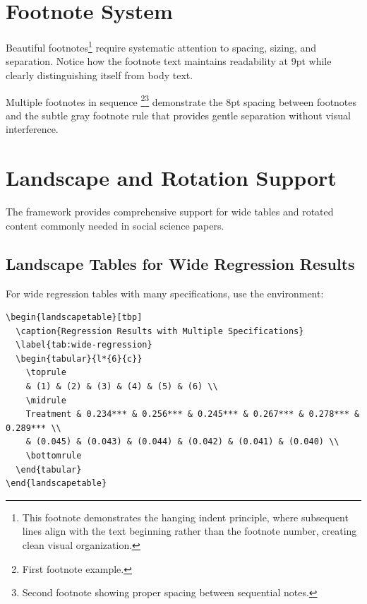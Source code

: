 \documentclass[11pt]{article}
\begin{document}
\section{Footnote System}

Beautiful footnotes\footnote{This footnote demonstrates the hanging indent principle, where subsequent lines align with the text beginning rather than the footnote number, creating clean visual organization.} require systematic attention to spacing, sizing, and separation. Notice how the footnote text maintains readability at 9pt while clearly distinguishing itself from body text.

Multiple footnotes in sequence \footnote{First footnote example.}\footnote{Second footnote showing proper spacing between sequential notes.} demonstrate the 8pt spacing between footnotes and the subtle gray footnote rule that provides gentle separation without visual interference.

\section{Landscape and Rotation Support}

The framework provides comprehensive support for wide tables and rotated content commonly needed in social science papers.

\subsection{Landscape Tables for Wide Regression Results}

For wide regression tables with many specifications, use the  environment:

\begin{verbatim}
\begin{landscapetable}[tbp]
  \caption{Regression Results with Multiple Specifications}
  \label{tab:wide-regression}
  \begin{tabular}{l*{6}{c}}
    \toprule
    & (1) & (2) & (3) & (4) & (5) & (6) \\
    \midrule
    Treatment & 0.234*** & 0.256*** & 0.245*** & 0.267*** & 0.278*** & 0.289*** \\
    & (0.045) & (0.043) & (0.044) & (0.042) & (0.041) & (0.040) \\
    \bottomrule
  \end{tabular}
\end{landscapetable}
\end{verbatim}
\end{document}

